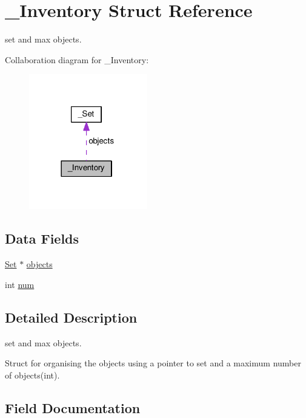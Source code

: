 \hypertarget{struct__Inventory}{}\section{\+\_\+\+Inventory Struct Reference}
\label{struct__Inventory}


set and max objects.  




Collaboration diagram for \+\_\+\+Inventory\+:
\nopagebreak
\begin{figure}[H]
\begin{center}
\leavevmode
\includegraphics[width=146pt]{struct__Inventory__coll__graph}
\end{center}
\end{figure}
\subsection*{Data Fields}
\begin{DoxyCompactItemize}
\item 
\hyperlink{set_8h_a6d3b7f7c92cbb4577ef3ef7ddbf93161}{Set} $\ast$ \hyperlink{struct__Inventory_a478e4b50a62b9e7d5b17e335319faa97}{objects}
\item 
int \hyperlink{struct__Inventory_a230ffe8c2f84e67f284d43f8a8622d53}{num}
\end{DoxyCompactItemize}


\subsection{Detailed Description}
set and max objects. 

Struct for organising the objects using a pointer to set and a maximum number of objects(int). 

\subsection{Field Documentation}
